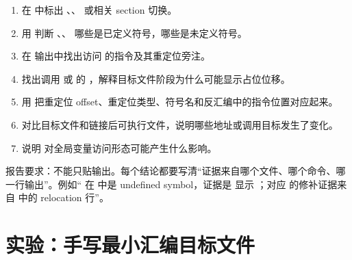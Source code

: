 \begin{labbox}
\begin{enumerate}
  \item 在  中标出 、、 或相关 section 切换。
  \item 用  判断 、、 哪些是已定义符号，哪些是未定义符号。
  \item 在  输出中找出访问  的指令及其重定位旁注。
  \item 找出调用  或  的 ，解释目标文件阶段为什么可能显示占位位移。
  \item 用  把重定位 offset、重定位类型、符号名和反汇编中的指令位置对应起来。
  \item 对比目标文件和链接后可执行文件，说明哪些地址或调用目标发生了变化。
  \item 说明  对全局变量访问形态可能产生什么影响。
\end{enumerate}

报告要求：不能只贴输出。每个结论都要写清“证据来自哪个文件、哪个命令、哪一行输出”。例如“ 在  中是 undefined symbol，证据是  显示 ；对应  的修补证据来自  中的 relocation 行”。
\end{labbox}

\section{实验：手写最小汇编目标文件}

